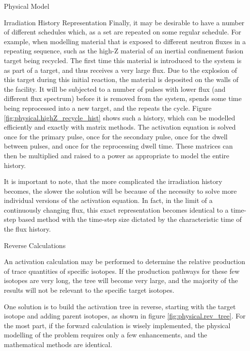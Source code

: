\begin{chapter}{Physical Model\label{chap:physical}}
\begin{section}{Irradiation History Representation}
  Finally, it may be desirable to have a number of different schedules
  which, as a set are repeated on some regular schedule.  For example,
  when modelling material that is exposed to different neutron fluxes
  in a repeating sequence, such as the high-Z material of an inertial
  confinement fusion target being recycled.  The first time this
  material is introduced to the system is as part of a target, and
  thus receives a very large flux.  Due to the explosion of this
  target during this initial reaction, the material is deposited on
  the walls of the facility.  It will be subjected to a number of
  pulses with lower flux (and different flux spectrum) before it is
  removed from the system, spends some time being reprocessed into a
  new target, and the repeats the cycle.  Figure
  \ref{fig:physical.highZ_recycle_hist} shows such a history, which
  can be modelled efficiently and exactly with matrix methods.  The
  activation equation is solved once for the primary pulse, once for
  the secondary pulse, once for the dwell between pulses, and once for
  the reprocessing dwell time.  These matrices can then be multiplied
  and raised to a power as appropriate to model the entire history.

  It is important to note, that the more complicated the irradiation
  history becomes, the slower the solution will be because of the
  necessity to solve more individual versions of the activation
  equation.  In fact, in the limit of a continuously changing flux,
  this exact representation becomes identical to a time-step based
  method with the time-step size dictated by the characteristic time
  of the flux history.
\end{section}


\begin{section}{Reverse Calculations}
  
  An activation calculation may be performed to determine the relative
  production of trace quantities of specific isotopes.  If the
  production pathways for these few isotopes are very long, the tree
  will become very large, and the majority of the results will not be
  relevant to the specific target isotopes.
  
  One solution is to build the activation tree in reverse, starting
  with the target isotope and adding parent isotopes, as shown in
  figure \ref{fig:physical.rev_tree}.  For the most part, if the
  forward calculation is wisely implemented, the physical modelling of
  the problem requires only a few enhancements, and the mathematical
  methods are identical.
  

\end{section}
\end{chapter}
